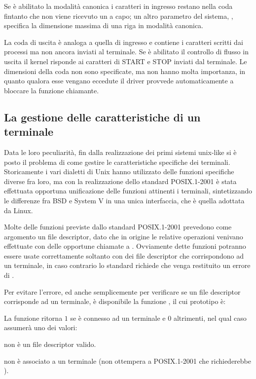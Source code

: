 Se è abilitato la modalità canonica i caratteri in ingresso restano nella coda
fintanto che non viene ricevuto un a capo; un altro parametro del sistema,
, specifica la dimensione massima di una riga in modalità
canonica.

La coda di uscita è analoga a quella di ingresso e contiene i caratteri
scritti dai processi ma non ancora inviati al terminale. Se è abilitato il
controllo di flusso in uscita il kernel risponde ai caratteri di START e STOP
inviati dal terminale. Le dimensioni della coda non sono specificate, ma non
hanno molta importanza, in quanto qualora esse vengano eccedute il driver
provvede automaticamente a bloccare la funzione chiamante.



\subsection{La gestione delle caratteristiche di un terminale}
\label{sec:term_attr}

Data le loro peculiarità, fin dalla realizzazione dei primi sistemi unix-like
si è posto il problema di come gestire le caratteristiche specifiche dei
terminali. Storicamente i vari dialetti di Unix hanno utilizzato delle
funzioni specifiche diverse fra loro, ma con la realizzazione dello standard
POSIX.1-2001 è stata effettuata opportuna unificazione delle funzioni
attinenti i terminali, sintetizzando le differenze fra BSD e System V in una
unica interfaccia, che è quella adottata da Linux.

Molte delle funzioni previste dallo standard POSIX.1-2001 prevedono come
argomento un file descriptor, dato che in origine le relative operazioni
venivano effettuate con delle opportune chiamate a .  Ovviamente
dette funzioni potranno essere usate correttamente soltanto con dei file
descriptor che corrispondono ad un terminale, in caso contrario lo standard
richiede che venga restituito un errore di .

Per evitare l'errore, ed anche semplicemente per verificare se un file
descriptor corrisponde ad un terminale, è disponibile la funzione
, il cui prototipo è:

\begin{funcproto}{
}

{La funzione ritorna $1$ se  è connesso ad un terminale e $0$
  altrimenti, nel qual caso  assumerà uno dei valori:
  \begin{errlist}
  \item[\errcode{EBADF}]  non è un file descriptor valido.
  \item[\errcode{EINVAL}]  non è associato a un terminale (non
    ottempera a POSIX.1-2001 che richiederebbe ).
  \end{errlist}
}
\end{funcproto}

